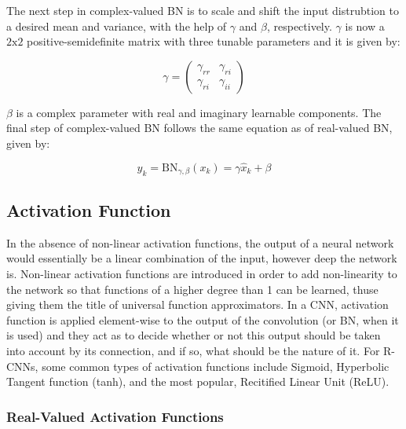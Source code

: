 The next step in complex-valued BN is to scale and shift the input distrubtion to a desired mean and variance, with the help of $\gamma$ and $\beta$, respectively. $\gamma$ is now a $\mathrm{2} \mathrm{x} \mathrm{2}$ positive-semidefinite matrix with three tunable parameters and it is given by:

\begin{equation}
\gamma = \begin{pmatrix} \gamma_{rr} & \gamma_{ri}\\ \gamma_{ri} & \gamma_{ii} \end{pmatrix} 
\label{eqcbn4}
\end{equation}

$\beta$ is a complex parameter with real and imaginary learnable components. The final step of complex-valued BN follows the same equation as of real-valued BN, given by:

 \begin{equation}
y_{k} = \mathrm{BN}_{\gamma,\beta}(x_{k}) = \gamma\hat{x}_{k} + \beta
\label{eqcbn5}
\end{equation}

 \subsection{Activation Function}\label{ssec:act_fn}
 In the absence of non-linear activation functions, the output of a neural network would essentially be a linear combination of the input, however deep the network is. Non-linear activation functions are introduced in order to add non-linearity to the network so that functions of a higher degree than 1 can be learned, thuse giving them the title of universal function approximators. In a CNN, activation function is applied element-wise to the output of the convolution (or BN, when it is used) and they act as to decide whether or not this output should be taken into account by its connection, and if so, what should be the nature of it. For $\mathrm{R}$-CNNs, some common types of activation functions include Sigmoid, Hyperbolic Tangent function (tanh), and the most popular, Recitified Linear Unit (ReLU).
 
 
  \subsubsection{Real-Valued Activation Functions}
